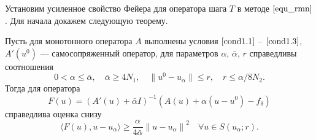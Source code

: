 Установим усиленное свойство Фейера для оператора шага $T$ в методе $\eqref{equ_rmn}$. Для начала докажем следующую теорему.
\begin{theorem}\label{teo2.2} Пусть для монотонного оператора $A$ выполнены условия $\eqref{cond1.1}$ -- $\eqref{cond1.3}$, $A'(u^0)$ --- самосопряженный оператор, для параметров $\alpha$, $\bar{\alpha}$, $r$ справедливы соотношения 
	\begin{equation}\label{cond2.7}
	0<\alpha\le\bar\alpha,\quad\bar\alpha\ge 4N_1,\quad
	\|u^0-u_\alpha\| \le r, \quad r\le\alpha/8N_2.
	\end{equation}
	Тогда для оператора
	$$ F(u)=(A'(u)+\bar\alpha I)^{-1}(A(u)+\alpha(u-u^0)-f_\delta) $$
	справедлива оценка снизу
	\begin{equation}\label{est2.8}
	\langle F(u), u-u_\alpha\rangle\ge\frac{\alpha}{4\bar\alpha}{\|u-u_\alpha\|}^2 \quad \forall u \in S(u_\alpha;r).
	\end{equation}
\end{theorem}
